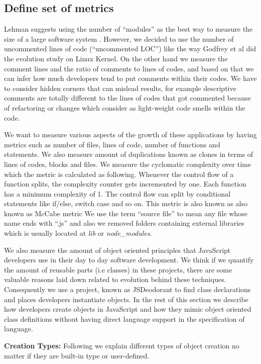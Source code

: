 \subsection{Define set of metrics}

Lehman suggests using the number of “modules” as the best way to measure the size of a large software system \cite{Lehman1997METRICS}. However, we decided to use the number of uncommented lines of code (“uncommented LOC”) like the way Godfrey et al \cite{Godfrey2000ICMS} did the evolution study on Linux Kernel. On the other hand we measure the comment lines and the ratio of comments to lines of codes, and based on that we can infer how much developers tend to put comments within their codes. We have to consider hidden corners that can mislead results, for example descriptive comments are totally different to the lines of codes that got commented because of refactoring or changes which consider as light-weight code smells within the code.

We want to measure various aspects of the growth of these applications by having metrics such as number of files, lines of code, number of functions and statements. We also measure amount of duplications known as clones in terms of lines of codes, blocks and files. We measure the cyclomatic complexity over time which the metric is calculated as following. Whenever the control flow of a function splits, the complexity counter gets incremented by one. Each function has a minimum complexity of 1. The control flow can split by conditional statements like if/else, switch case and so on. This metric is also known as also known as McCabe metric
We use the term “source file” to mean any file whose name ends with “.js” and also we removed folders containing external libraries which is usually located at \textit{lib} or \textit{node\_modules}. 

We also measure the amount of object oriented principles that JavaScript developers use in their day to day software development. We think if we quantify the amount of reusable parts (i.e classes) in these projects, there are some valuable reasons laid down related to evolution behind these techniques. Consequently we use a project, known as JSDeodorant to find class declarations and places developers instantiate objects.
In the rest of this section we describe how developers create objects in JavaScript and how they mimic object oriented class definitions without having direct language support in the specification of language.

\noindent\textbf{Creation Types:} Following we explain different types of object creation no matter if they are built-in type or user-defined. 

